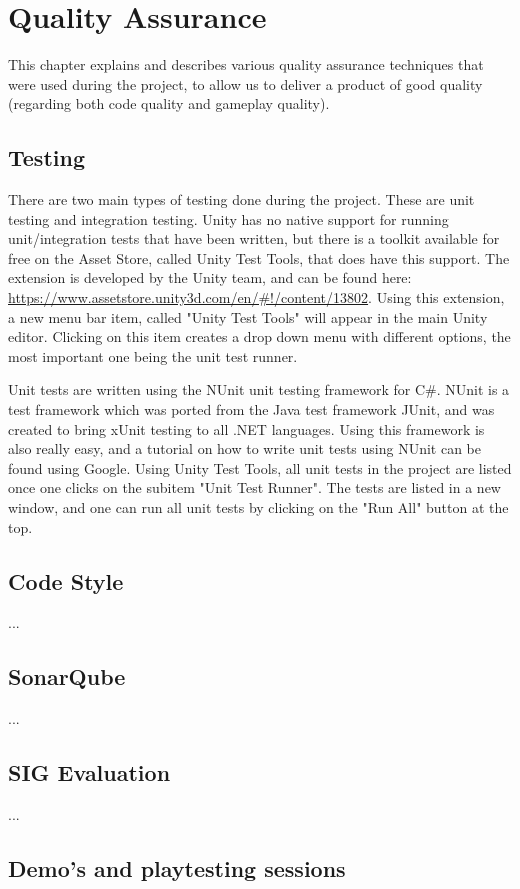 \chapter{Quality Assurance} \label{cha:qa}
	This chapter explains and describes various quality assurance techniques 
	that were used during the project, to allow us to deliver a product of 
	good quality (regarding both code quality and gameplay quality).

	\section{Testing} \label{sec:testing}
	There are two main types of testing done during the project. These are
	unit testing and integration testing. Unity has no native support for
	running unit/integration tests that have been written, but there is a toolkit
	available for free on the Asset Store, called Unity Test Tools, that does
	have this support. The extension is developed by the Unity team, and can be 
	found here: \url{https://www.assetstore.unity3d.com/en/#!/content/13802}.
	Using this extension, a new menu bar item, called "Unity Test Tools"
	will appear in the main Unity editor. Clicking on this item creates a drop
	down menu with different options, the most important one being the unit test
	runner.
	
	Unit tests are written using the NUnit unit testing framework for C\#. NUnit
	is a test framework which was ported from the Java test framework JUnit, and
	was created to bring xUnit testing to all .NET languages. Using this framework
	is also really easy, and a tutorial on how to write unit tests using NUnit
	can be found using Google. Using Unity Test Tools, all unit tests in the
	project are listed once one clicks on the subitem "Unit Test Runner".
	The tests are listed in a new window, and one can run all unit tests by
	clicking on the "Run All" button at the top. 
		
	\section{Code Style} \label{sec:codestyle}
		...
		
	\section{SonarQube} \label{sec:sonarqube}
		...
		
	\section{SIG Evaluation} \label{sec:sigevaluation}
		...
		
	\section{Demo's and playtesting sessions} \label{sec:demos}
